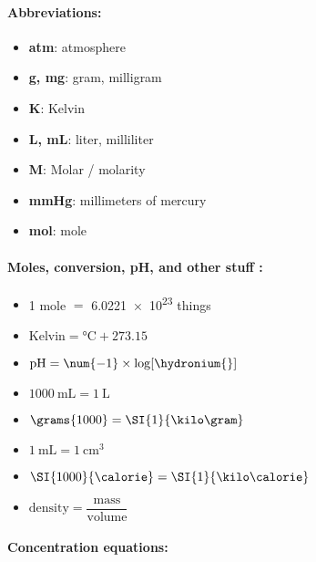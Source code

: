 \documentclass[9pt]{article}
\begin{document}
    \newpage
    \begin{multicols}{2}
        \paragraph{\textsf{Abbreviations:}}
        \begin{itemize}
            \item \textbf{atm}: atmosphere
            \item \textbf{g, mg}: gram, milligram
            \item \textbf{K}: Kelvin
            \item \textbf{L, mL}: liter, milliliter
            \item \textbf{\textsc{M}}: Molar / molarity
            \item \textbf{mmHg}: millimeters of mercury
            \item \textbf{mol}: mole
        \end{itemize}
    \vspace{0.5cm}

    \paragraph{\textsf{Moles, conversion, pH, and other stuff : \newline}}

    \begin{itemize}
        \item 1 mole \( = \) \num{6.0221e23} things
        \item \( \textrm{Kelvin} = \si{\degreeCelsius} + \num{273.15} \)
        \item \( \textrm{pH} = \num{-1} \times  \log [\hydronium{}] \)
        \item \( \SI{1000}{\milli \liter} = \SI{1}{\liter} \)
        \item \( \grams{1000} = \SI{1}{\kilo \gram} \)
        \item \( \SI{1}{\milli \liter} = \SI{1}{\centi \meter \cubed} \)
        \item \( \SI{1000}{\calorie} = \SI{1}{\kilo \calorie} \)
        \item \( \text{density} = \dfrac{\text{mass}}{\text{volume}}\)
    \end{itemize}
\vspace{0.5cm}


\paragraph{\textsf{Concentration equations:}}


\end{multicols}
\end{document}

